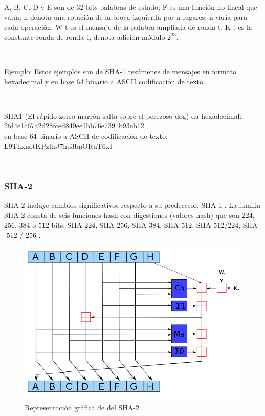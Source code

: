 \documentclass[11pt, conference]{IEEEtran}
\begin{document}
A, B, C, D y E son de 32 bits palabras de estado; F es una función no lineal que varía; n denota una rotación de la broca izquierda por n lugares; n varía para cada operación; W t es el mensaje de la palabra ampliada de ronda t; K t es la constante ronda de ronda t; denota adición módulo $2^23$.

\

Ejemplo:
Estos ejemplos son de SHA-1 resúmenes de mensajes en formato hexadecimal y en base 64 binario a ASCII codificación de texto.

\

SHA1 (El rápido zorro marrón salta sobre el perezoso dog) da hexadecimal:\\
2fd4e1c67a2d28fced849ee1bb76e7391b93eb12\\
en base 64 binario a ASCII de codificación de texto:\\
L9ThxnotKPzthJ7hu3bnORuT6xI

\

\subsubsection{SHA-2}

SHA-2 incluye cambios significativos respecto a su predecesor, SHA-1 . La familia SHA-2 consta de seis funciones hash con digestiones (valores hash) que son 224, 256, 384 o 512 bits: SHA-224, SHA-256, SHA-384, SHA-512, SHA-512/224, SHA -512 / 256 .

\begin{figure}[h]
	\centering
	\includegraphics[scale=0.3]{imagen_2.png} 
	\caption{Representación gráfica de del SHA-2}
\end{figure}
\end{document}
